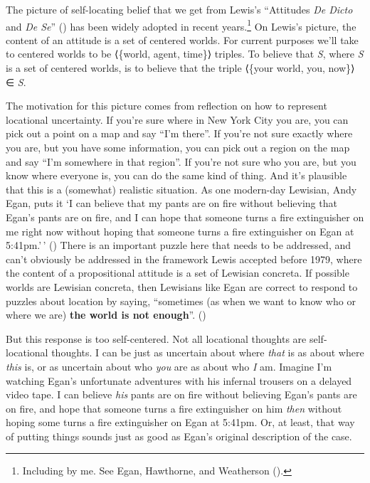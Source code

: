 \documentclass[
  11pt,
  letterpaper,
  DIV=11,
  numbers=noendperiod,
  twoside]{scrartcl}
\begin{document}
The picture of self-locating belief that we get from Lewis's ``Attitudes
\emph{De Dicto} and \emph{De Se}'' () has been widely adopted in recent years.\footnote{Including by
  me. See Egan, Hawthorne, and Weatherson
  ().} On Lewis's picture, the
content of an attitude is a set of centered worlds. For current purposes
we'll take to centered worlds to be ⟨\{world, agent, time\}⟩ triples. To
believe that \emph{S}, where \emph{S} is a set of centered worlds, is to
believe that the triple ⟨\{your world, you, now\}⟩ ∈ \emph{S}.

The motivation for this picture comes from reflection on how to
represent locational uncertainty. If you're sure where in New York City
you are, you can pick out a point on a map and say ``I'm there''. If
you're not sure exactly where you are, but you have some information,
you can pick out a region on the map and say ``I'm somewhere in that
region''. If you're not sure who you are, but you know where everyone
is, you can do the same kind of thing. And it's plausible that this is a
(somewhat) realistic situation. As one modern-day Lewisian, Andy Egan,
puts it `I can believe that my pants are on fire without believing that
Egan's pants are on fire, and I can hope that someone turns a fire
extinguisher on me right now without hoping that someone turns a fire
extinguisher on Egan at 5:41pm.'\,'
() There is an important
puzzle here that needs to be addressed, and can't obviously be addressed
in the framework Lewis accepted before 1979, where the content of a
propositional attitude is a set of Lewisian concreta. If possible worlds
are Lewisian concreta, then Lewisians like Egan are correct to respond
to puzzles about location by saying, ``sometimes (as when we want to
know who or where we are) \textbf{the world is not enough}''.
()

But this response is too self-centered. Not all locational thoughts are
self-locational thoughts. I can be just as uncertain about where
\emph{that} is as about where \emph{this} is, or as uncertain about who
\emph{you} are as about who \emph{I} am. Imagine I'm watching Egan's
unfortunate adventures with his infernal trousers on a delayed video
tape. I can believe \emph{his} pants are on fire without believing
Egan's pants are on fire, and hope that someone turns a fire
extinguisher on him \emph{then} without hoping some turns a fire
extinguisher on Egan at 5:41pm. Or, at least, that way of putting things
sounds just as good as Egan's original description of the case.
\end{document}
